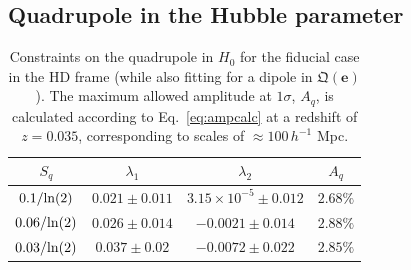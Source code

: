 \documentclass[fleqn,usenatbib]{mnras}
\newcommand{\jess}[1]{\textcolor{magenta} {\textbf{[JAC]:{#1}}}}
\begin{document}

\color{black}
\subsection{Quadrupole in the Hubble parameter}\label{sec:quadconstraints}

\begin{table}
    \centering
    \begin{tabular}{c|c|c|c|}
    \hline
    $S_q$ &  $\lambda_1$ & $\lambda_2$ & $A_q$ \\
    \hline
     $ 0.1/{\rm ln}(2)$ & $ 0.021\pm{ 0.011}
$ & $ {3.15\times 10^{-5}}\pm 0.012$& $2.68\%$ \\
    
     $0.06/{\rm ln}(2)$ & $0.026 \pm {0.014}$&$-0.0021\pm { 0.014}$ & $2.88\%$ \\
 $ 0.03/{\rm ln}(2)$ &$ 0.037 \pm 0.02$& $ -0.0072\pm {0.022}$ & $2.85\%$ \\
    \hline
    \end{tabular}
    \caption{Constraints on the quadrupole in $H_0$ for the fiducial case in the HD frame %
    (while also fitting for a dipole in $\mathfrak{Q}(\boldsymbol{e})$). The {maximum allowed} amplitude {at $1\sigma$,} $A_q$, is calculated according to Eq.~\eqref{eq:ampcalc} at a redshift of $z = 0.035$, corresponding to scales of $\approx 100\,h^{-1}$ Mpc. }
    \label{tab:quad}
\end{table}
\end{document}
